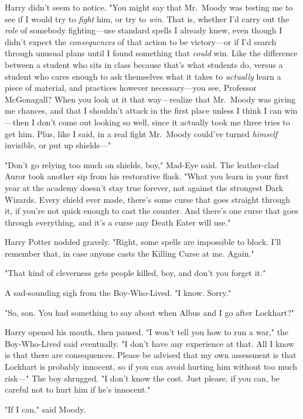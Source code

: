 Harry didn't seem to notice. "You might say that Mr.~Moody was testing me to see if I would try to \emph{fight} him, or try to \emph{win.} That is, whether I'd carry out the \emph{role} of somebody fighting---use standard spells I already knew, even though I didn't expect the \emph{consequences} of that action to be victory---or if I'd search through unusual plans until I found something that \emph{could} win. Like the difference between a student who sits in class because that's what students do, versus a student who cares enough to ask themselves what it takes to \emph{actually} learn a piece of material, and practices however necessary---you see, Professor McGonagall? When you look at it that way---realize that Mr.~Moody was giving me chances, and that I shouldn't attack in the first place unless I think I can win---then I don't come out looking so well, since it actually took me three tries to get him. Plus, like I said, in a real fight Mr.~Moody could've turned \emph{himself} invisible, or put up shields---"

"Don't go relying too much on shields, boy," Mad-Eye said. The leather-clad Auror took another sip from his restorative flask. "What you learn in your first year at the academy doesn't stay true forever, not against the strongest Dark Wizards. Every shield ever made, there's some curse that goes straight through it, if you're not quick enough to cast the counter. And there's one curse that goes through everything, and it's a curse any Death Eater will use."

Harry Potter nodded gravely. "Right, some spells are impossible to block. I'll remember that, in case anyone casts the Killing Curse at me. Again."

"That kind of cleverness gets people killed, boy, and don't you forget it."

A sad-sounding sigh from the Boy-Who-Lived. "I know. Sorry."

"So, son. You had something to say about when Albus and I go after Lockhart?"

Harry opened his mouth, then paused. "I won't tell you how to run a war," the Boy-Who-Lived said eventually. "I don't have any experience at that. All I know is that there are consequences. Please be advised that my own assessment is that Lockhart is probably innocent, so if you can avoid hurting him without too much risk---" The boy shrugged. "I don't know the cost. Just please, if you can, be careful not to hurt him if he's innocent."

"If I can," said Moody.

